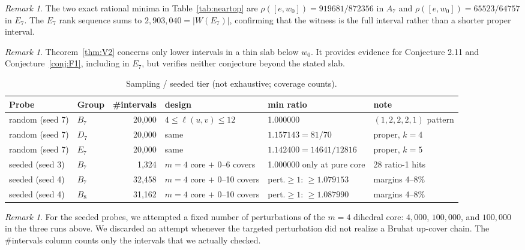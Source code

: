\documentclass[11pt]{amsart}
\theoremstyle{plain}
\theoremstyle{definition}
\theoremstyle{remark}
\newtheorem{remark}[theorem]{Remark}
\begin{document}
\begin{remark}
The two exact rational minima in Table~\ref{tab:neartop} are
$\rho([e,w_0])=919681/872356$ in $A_7$ and
$\rho([e,w_0])=65523/64757$ in $E_7$. The $E_7$ rank sequence sums to
$2{,}903{,}040=|W(E_7)|$, confirming that the witness is the full interval rather than a shorter proper interval.
\end{remark}

\begin{remark}
Theorem~\ref{thm:V2} concerns only lower intervals in a thin slab below
$w_0$. It provides evidence for Conjecture 2.11 and
Conjecture~\ref{conj:F1}, including in $E_7$, but verifies neither
conjecture beyond the stated slab.
\end{remark}

\begin{table}[htbp]
\centering
\caption{Sampling / seeded tier (not exhaustive; coverage counts).}
\label{tab:sampling}
\footnotesize
\begin{tabular}{@{}llrlll@{}}
\toprule
Probe & Group & \#intervals & design & min ratio & note \\
\midrule
random (seed 7) & $B_7$ & 20{,}000 & $4\le\ell(u,v)\le12$ & 1.000000 & $(1,2,2,2,1)$ pattern \\
random (seed 7) & $D_7$ & 20{,}000 & same & $1.157143=81/70$ & proper, $k{=}4$ \\
random (seed 7) & $E_7$ & 20{,}000 & same & $1.142400=14641/12816$ & proper, $k{=}5$ \\
seeded (seed 3) & $B_7$ & 1{,}324 & $m{=}4$ core $+$ 0--6 covers & 1.000000 only at pure core & 28 ratio-1 hits \\
seeded (seed 4) & $B_7$ & 32{,}458 & $m{=}4$ core $+$ 0--10 covers & pert.$\ge1$: $\ge 1.079153$ & margins 4--8\% \\
seeded (seed 4) & $B_8$ & 31{,}162 & $m{=}4$ core $+$ 0--10 covers & pert.$\ge1$: $\ge 1.087990$ & margins 4--8\% \\
\bottomrule
\end{tabular}
\end{table}

\begin{remark}
For the seeded probes, we attempted a fixed number of perturbations of the
$m=4$ dihedral core: $4{,}000$, $100{,}000$, and $100{,}000$ in the three
runs above. We discarded an attempt whenever the targeted perturbation did
not realize a Bruhat up-cover chain. The \#intervals column counts only the
intervals that we actually checked.
\end{remark}
\end{document}
